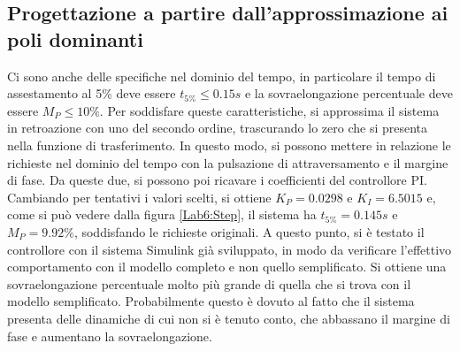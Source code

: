 \documentclass[a4paper, 11pt]{article}
\begin{document}
\subsection{Progettazione a partire dall'approssimazione ai poli dominanti}
Ci sono anche delle specifiche nel dominio del tempo, in particolare il tempo di assestamento al 5\% deve essere $t_{5\%} \le 0.15s$ e la sovraelongazione percentuale deve essere $M_{P} \le 10\%$. Per soddisfare queste caratteristiche, si approssima il sistema in retroazione con uno del secondo ordine, trascurando lo zero che si presenta nella funzione di trasferimento. In questo modo, si possono mettere in relazione le richieste nel dominio del tempo con la pulsazione di attraversamento e il margine di fase. Da queste due, si possono poi ricavare i coefficienti del controllore PI. Cambiando per tentativi i valori scelti, si ottiene $K_{P} = 0.0298$ e $K_{I} = 6.5015$ e, come si può vedere dalla figura \ref{Lab6:Step}, il sistema ha $t_{5\%} = 0.145s$ e $M_{P} = 9.92\%$, soddisfando le richieste originali. A questo punto, si è testato il controllore con il sistema Simulink già sviluppato, in modo da verificare l'effettivo comportamento con il modello completo e non quello semplificato. Si ottiene una sovraelongazione percentuale molto più grande di quella che si trova con il modello semplificato. Probabilmente questo è dovuto al fatto che il sistema presenta delle dinamiche di cui non si è tenuto conto, che abbassano il margine di fase e aumentano la sovraelongazione.
\end{document}
